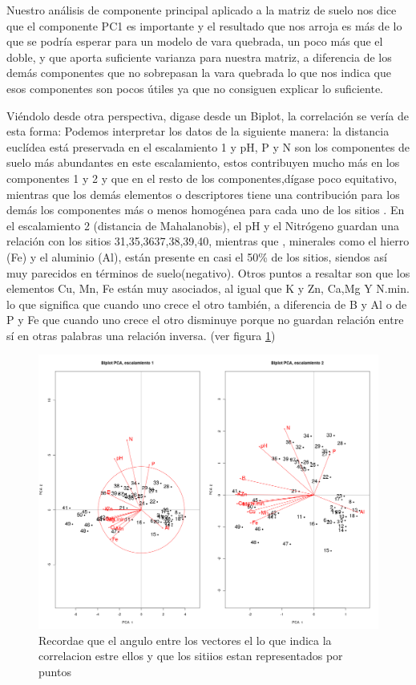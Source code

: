 \documentclass[11pt,]{article}
\begin{document}
Nuestro análisis de componente principal aplicado a la matriz de suelo
nos dice que el componente PC1 es importante y el resultado que nos
arroja es más de lo que se podría esperar para un modelo de vara
quebrada, un poco más que el doble, y que aporta suficiente varianza
para nuestra matriz, a diferencia de los demás componentes que no
sobrepasan la vara quebrada lo que nos indica que esos componentes son
pocos útiles ya que no consiguen explicar lo suficiente.

Viéndolo desde otra perspectiva, digase desde un Biplot, la correlación
se vería de esta forma: Podemos interpretar los datos de la siguiente
manera: la distancia euclídea está preservada en el escalamiento 1 y pH,
P y N son los componentes de suelo más abundantes en este escalamiento,
estos contribuyen mucho más en los componentes 1 y 2 y que en el resto
de los componentes,dígase poco equitativo, mientras que los demás
elementos o descriptores tiene una contribución para los demás los
componentes más o menos homogénea para cada uno de los sitios . En el
escalamiento 2 (distancia de Mahalanobis), el pH y el Nitrógeno guardan
una relación con los sitios 31,35,3637,38,39,40, mientras que ,
minerales como el hierro (Fe) y el aluminio (Al), están presente en casi
el 50\% de los sitios, siendos así muy parecidos en términos de
suelo(negativo). Otros puntos a resaltar son que los elementos Cu, Mn,
Fe están muy asociados, al igual que K y Zn, Ca,Mg Y N.min. lo que
significa que cuando uno crece el otro también, a diferencia de B y Al o
de P y Fe que cuando uno crece el otro disminuye porque no guardan
relación entre sí en otras palabras una relación inversa. (ver figura
\ref{fig:Biplot_pca1_pca2})

\begin{figure}
\centering
\includegraphics{Biplot_pca1_pca2.png}
\caption{\label{fig:Biplot_pca1_pca2}Recordae que el angulo entre los
vectores el lo que indica la correlacion estre ellos y que los sitiios
estan representados por puntos}
\end{figure}
\end{document}
